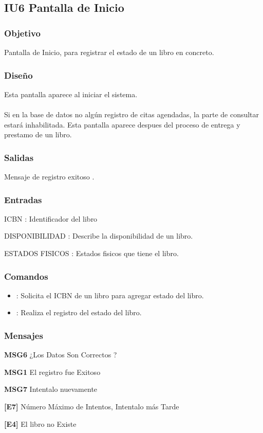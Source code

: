 \newpage
\subsection{IU6 Pantalla de Inicio}

\subsubsection{Objetivo}
	Pantalla de Inicio, para registrar el estado de un libro en concreto.

\subsubsection{Diseño}
	Esta pantalla aparece al iniciar el sistema.  \\\\
	Si en la base de datos no algún registro de citas agendadas, la parte de consultar estará inhabilitada. 
	Esta pantalla aparece despues del proceso de entrega y prestamo de un libro.


\subsubsection{Salidas}
	\begin{Citemize}
		\item Mensaje de registro exitoso . 
	\end{Citemize}
	
\subsubsection{Entradas}
	\begin{Citemize}
		\item ICBN : Identificador del libro
		\item DISPONIBILIDAD : Describe la disponibilidad de un libro.
		\item ESTADOS FISICOS : Estados fisicos que tiene el libro.
	\end{Citemize}

\subsubsection{Comandos} 
\begin{itemize}
	\item {}: Solicita el ICBN de un libro para agregar estado del libro.
	\item {}: Realiza el registro del estado del libro.
\end{itemize}

\subsubsection{Mensajes}
	\begin{Citemize}
		\item {\bf  MSG6} ¿Los Datos Son Correctos ?
		\item {\bf  MSG1} El registro fue Exitoso
		\item {\bf  MSG7} Intentalo nuevamente
		\item {\bf  [E7]} Número Máximo de Intentos, Intentalo más Tarde
		 \item {\bf [E4]} El libro no Existe
	\end{Citemize}
